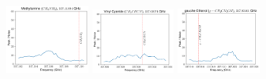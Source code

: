\documentclass[12pt]{article}
\begin{document}
\begin{figure}
\includegraphics[width=0.245\textwidth]{spw0_CH3NH2}
\includegraphics[width=0.245\textwidth]{spw0_CH2CHCN}
\includegraphics[width=0.245\textwidth]{spw0_g-CH3CH2OH}
\end{figure}
\end{document}
